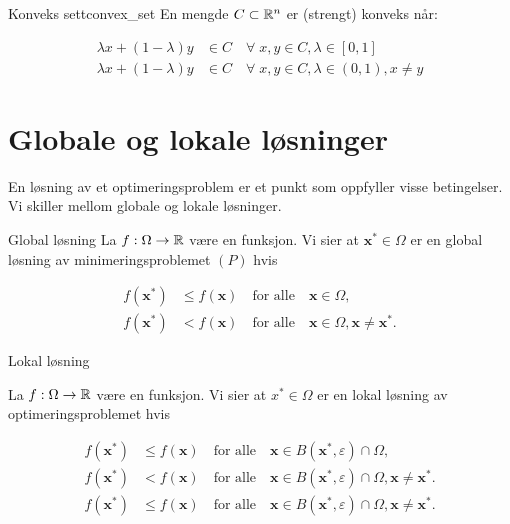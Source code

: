 \begin{definition}{Konveks sett}{convex_set}
  En mengde \(C \subset \mathbb{R}^n\) er (strengt) konveks når:

  \begin{align*}
    \lambda x + (1 - \lambda)y & \in C \quad \forall \; x, y \in C, \lambda \in [0, 1] \tag{Konveks}                   \\
    \lambda x + (1 - \lambda)y & \in C \quad \forall \; x, y \in C, \lambda \in (0, 1), x \neq y \tag{Strengt konveks}
  \end{align*}

\end{definition}


\section{Globale og lokale løsninger}

En løsning av et optimeringsproblem er et punkt som oppfyller visse betingelser.
Vi skiller mellom globale og lokale løsninger.

\begin{definition}{Global løsning}{}
  La \(f: \Omega \to \mathbb{R}\) være en funksjon. Vi sier at \(\symbf{x}^* \in \Omega\) er en global løsning av minimeringsproblemet \((P)\) hvis

  \begin{align*}
    f(\symbf{x}^*) & \leq f(\symbf{x}) \quad \text{for alle} \quad \symbf{x} \in \Omega, \tag{Global løsning}                                 \\
    f(\symbf{x}^*) & < f(\symbf{x}) \quad \text{for alle} \quad \symbf{x} \in \Omega, \symbf{x} \neq \symbf{x}^*. \tag{Streng global løsning}
  \end{align*}
\end{definition}

\begin{definition}{Lokal løsning}{}

  La \(f: \Omega \to \mathbb{R}\) være en funksjon. Vi sier at \(x^* \in \Omega\) er en lokal løsning av optimeringsproblemet hvis

  \begin{align*}
    f(\symbf{x}^*) & \leq f(\symbf{x}) \quad \text{for alle} \quad \symbf{x} \in B(\symbf{x}^*, \varepsilon) \cap \Omega, \tag{Lokal løsning}                                     \\
    f(\symbf{x}^*) & < f(\symbf{x}) \quad \text{for alle} \quad \symbf{x} \in B(\symbf{x}^*, \varepsilon) \cap \Omega, \symbf{x} \neq \symbf{x}^*. \tag{Streng lokal løsning}     \\
    f(\symbf{x}^*) & \leq f(\symbf{x}) \quad \text{for alle} \quad \symbf{x} \in B(\symbf{x}^*, \varepsilon) \cap \Omega, \symbf{x} \neq \symbf{x}^*. \tag{Isolert lokal løsning}
  \end{align*}
\end{definition}

